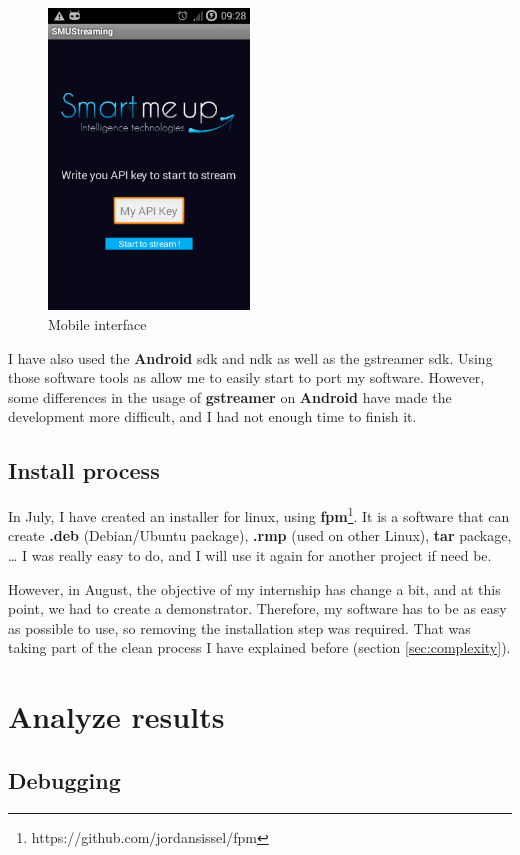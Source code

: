 \documentclass[a4paper,11pt]{custom}
\newcommand{\gstreamer}{\textbf{gstreamer}\xspace}
\newcommand{\fpm}{\textbf{fpm}\xspace}
\newcommand{\android}{\textbf{Android}\xspace}
\begin{document}
\begin{figure}
\centering
\includegraphics[height=8cm]{smu_mobile.jpg}
\caption{Mobile interface}
\label{fig:smumobile}
\end{figure}

I have also used the \android{} sdk and ndk as well as the gstreamer sdk. Using
those software tools as allow me to easily start to port my software. However,
some differences in the usage of \gstreamer{} on \android{} have made the
development more difficult, and I had not enough time to finish it.

\subsection{Install process}

In July, I have created an installer for linux, using
\fpm{}\footnote{https://github.com/jordansissel/fpm}. It is a software that can
create \textbf{.deb} (Debian/Ubuntu package), \textbf{.rmp} (used on other
Linux), \textbf{tar} package, … I was really easy to do, and I will use it again
for another project if need be.

However, in August, the objective of my internship has change a bit, and at this
point, we had to create a demonstrator. Therefore, my software has to be as easy
as possible to use, so removing the installation step was required. That was
taking part of the clean process I have explained before (section
\ref{sec:complexity}).

\section{Analyze results}

\subsection{Debugging}
\end{document}
